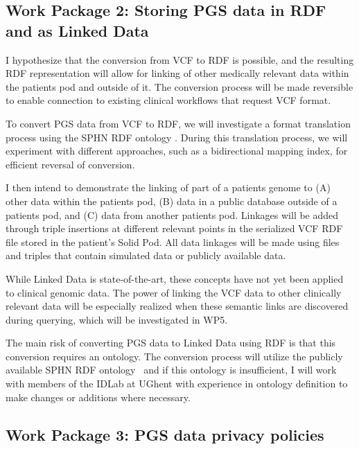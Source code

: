 \documentclass[runningheads]{llncs}
\begin{document}
\subsection{Work Package 2:  Storing PGS data in RDF and as Linked Data}

I hypothesize that the conversion from VCF to RDF is possible, and the resulting RDF representation will allow for linking of other medically relevant data within the patient\textquotesingle s pod and outside of it.
The conversion process will be made reversible to enable connection to existing clinical workflows that request VCF format. 

To convert PGS data from VCF to RDF, we will investigate a format translation process using the SPHN RDF ontology \cite{van_der_horst_bridging_2023}. 
During this translation process, we will experiment with different approaches, such as a bidirectional mapping index, for efficient reversal of conversion.

I then intend to demonstrate the linking of part of a patient\textquotesingle s genome to
(A) other data within the patient\textquotesingle s pod, 
(B) data in a public database outside of a patient\textquotesingle s pod, and
(C) data from another patient\textquotesingle s pod.
Linkages will be added through triple insertions at different relevant points in the serialized VCF RDF file stored in the patient's Solid Pod.
All data linkages will be made using files and triples that contain simulated data or publicly available data.

While Linked Data is state-of-the-art, these concepts have not yet been applied to clinical genomic data.
The power of linking the VCF data to other clinically relevant data will be especially realized when these semantic links are discovered during querying, which will be investigated in WP5. 

The main risk of converting PGS data to Linked Data using RDF is that this conversion requires an ontology. 
The conversion process will utilize the publicly available SPHN RDF ontology~\cite{van_der_horst_bridging_2023} and if this ontology is insufficient, I will work with members of the IDLab at UGhent with experience in ontology definition to make changes or additions where necessary.


\subsection{Work Package 3: PGS data privacy policies}
\end{document}
